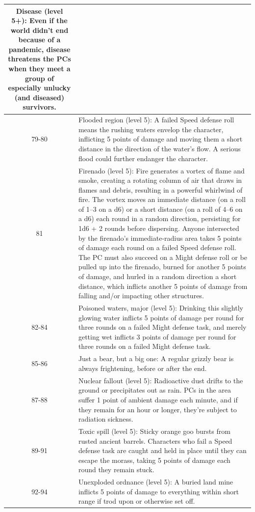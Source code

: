 \begin{longtable}{| c | p{15cm} |}
Disease (level 5+): Even if the world didn’t
end because of a pandemic, disease threatens the
PCs when they meet a group of especially unlucky
(and diseased) survivors. \\ \hline
79-80 &
Flooded region (level 5): A failed Speed
defense roll means the rushing waters envelop
the character, inflicting 5 points of damage and
moving them a short distance in the direction of the
water’s flow. A serious flood could further endanger
the character. \\ \hline
81 &
Firenado (level 5): Fire generates a vortex of
flame and smoke, creating a rotating column of
air that draws in flames and debris, resulting in a
powerful whirlwind of fire. The vortex moves an
immediate distance (on a roll of 1–3 on a d6) or a
short distance (on a roll of 4–6 on a d6) each round
in a random direction, persisting for 1d6 + 2
rounds before dispersing. Anyone intersected by
the firenado’s immediate‑radius area takes 5 points
of damage each round on a failed Speed defense
roll. The PC must also succeed on a Might defense
roll or be pulled up into the firenado, burned
for another 5 points of damage, and hurled in a
random direction a short distance, which inflicts
another 5 points of damage from falling and/or
impacting other structures. \\ \hline
82-84 &
Poisoned waters, major (level 5): Drinking
this slightly glowing water inflicts 5 points of
damage per round for three rounds on a failed
Might defense task, and merely getting wet inflicts
3 points of damage per round for three rounds on a
failed Might defense task. \\ \hline
85-86 &
Just a bear, but a big one: A regular grizzly
bear is always frightening, before or after the end. \\ \hline
87-88 &
Nuclear fallout (level 5): Radioactive dust
drifts to the ground or precipitates out as rain. PCs
in the area suffer 1 point of ambient damage each
minute, and if they remain for an hour or longer,
they’re subject to radiation sickness. \\ \hline
89-91 &
Toxic spill (level 5): Sticky orange goo bursts
from rusted ancient barrels. Characters who fail a
Speed defense task are caught and held in place
until they can escape the morass, taking 5 points of
damage each round they remain stuck. \\ \hline
92-94 &
Unexploded ordnance (level 5): A buried
land mine inflicts 5 points of damage to everything
within short range if trod upon or otherwise set off. \\ \hline

\end{longtable}
